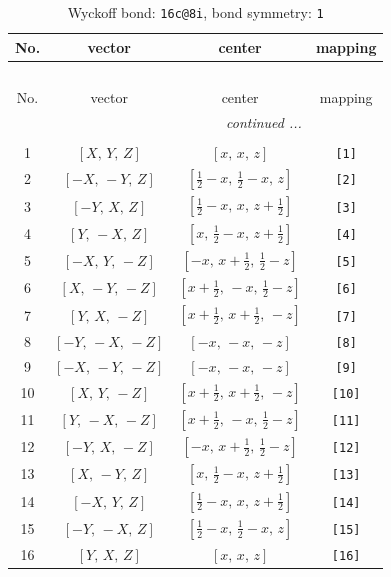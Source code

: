 \documentclass[fleqn,8pt]{jsarticle}
\begin{document}
\begin{longtable}{cccc}
\caption{Wyckoff bond: {\tt 16c@8i}, bond symmetry: {\tt 1}}
 \\
 \hline \hline
No. & vector & center & mapping \\ \hline \endfirsthead

\multicolumn{3}{l}{\tablename\ \thetable{}} \\
 \hline \hline
No. & vector & center & mapping \\ \hline \endhead

 \hline \hline
\multicolumn{3}{r}{\footnotesize\it continued ...} \\ \endfoot

 \hline \hline
\multicolumn{3}{r}{} \\ \endlastfoot

1 & $\left[ X,\, Y,\, Z \right]$ & $\left[ x,\, x,\, z \right]$ & {\tt [1]} \\ \hline
2 & $\left[ - X,\, - Y,\, Z \right]$ & $\left[ \frac{1}{2} - x,\, \frac{1}{2} - x,\, z \right]$ & {\tt [2]} \\ \hline
3 & $\left[ - Y,\, X,\, Z \right]$ & $\left[ \frac{1}{2} - x,\, x,\, z + \frac{1}{2} \right]$ & {\tt [3]} \\ \hline
4 & $\left[ Y,\, - X,\, Z \right]$ & $\left[ x,\, \frac{1}{2} - x,\, z + \frac{1}{2} \right]$ & {\tt [4]} \\ \hline
5 & $\left[ - X,\, Y,\, - Z \right]$ & $\left[ - x,\, x + \frac{1}{2},\, \frac{1}{2} - z \right]$ & {\tt [5]} \\ \hline
6 & $\left[ X,\, - Y,\, - Z \right]$ & $\left[ x + \frac{1}{2},\, - x,\, \frac{1}{2} - z \right]$ & {\tt [6]} \\ \hline
7 & $\left[ Y,\, X,\, - Z \right]$ & $\left[ x + \frac{1}{2},\, x + \frac{1}{2},\, - z \right]$ & {\tt [7]} \\ \hline
8 & $\left[ - Y,\, - X,\, - Z \right]$ & $\left[ - x,\, - x,\, - z \right]$ & {\tt [8]} \\ \hline
9 & $\left[ - X,\, - Y,\, - Z \right]$ & $\left[ - x,\, - x,\, - z \right]$ & {\tt [9]} \\ \hline
10 & $\left[ X,\, Y,\, - Z \right]$ & $\left[ x + \frac{1}{2},\, x + \frac{1}{2},\, - z \right]$ & {\tt [10]} \\ \hline
11 & $\left[ Y,\, - X,\, - Z \right]$ & $\left[ x + \frac{1}{2},\, - x,\, \frac{1}{2} - z \right]$ & {\tt [11]} \\ \hline
12 & $\left[ - Y,\, X,\, - Z \right]$ & $\left[ - x,\, x + \frac{1}{2},\, \frac{1}{2} - z \right]$ & {\tt [12]} \\ \hline
13 & $\left[ X,\, - Y,\, Z \right]$ & $\left[ x,\, \frac{1}{2} - x,\, z + \frac{1}{2} \right]$ & {\tt [13]} \\ \hline
14 & $\left[ - X,\, Y,\, Z \right]$ & $\left[ \frac{1}{2} - x,\, x,\, z + \frac{1}{2} \right]$ & {\tt [14]} \\ \hline
15 & $\left[ - Y,\, - X,\, Z \right]$ & $\left[ \frac{1}{2} - x,\, \frac{1}{2} - x,\, z \right]$ & {\tt [15]} \\ \hline
16 & $\left[ Y,\, X,\, Z \right]$ & $\left[ x,\, x,\, z \right]$ & {\tt [16]} \\
\end{longtable}
\end{document}
